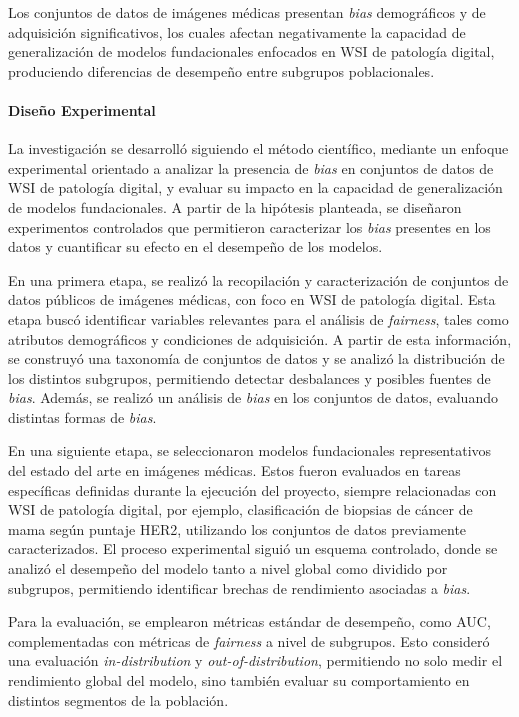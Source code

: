 Los conjuntos de datos de imágenes médicas presentan \textit{bias} demográficos y de adquisición significativos, los cuales afectan negativamente la capacidad de generalización de modelos fundacionales enfocados en WSI de patología digital, produciendo diferencias de desempeño entre subgrupos poblacionales.

\paragraph{Diseño Experimental}

La investigación se desarrolló siguiendo el método científico, mediante un enfoque experimental orientado a analizar la presencia de \textit{bias} en conjuntos de datos de WSI de patología digital, y evaluar su impacto en la capacidad de generalización de modelos fundacionales. A partir de la hipótesis planteada, se diseñaron experimentos controlados que permitieron caracterizar los \textit{bias} presentes en los datos y cuantificar su efecto en el desempeño de los modelos.

En una primera etapa, se realizó la recopilación y caracterización de conjuntos de datos públicos de imágenes médicas, con foco en WSI de patología digital. Esta etapa buscó identificar variables relevantes para el análisis de \textit{fairness}, tales como atributos demográficos y condiciones de adquisición. A partir de esta información, se construyó una taxonomía de conjuntos de datos y se analizó la distribución de los distintos subgrupos, permitiendo detectar desbalances y posibles fuentes de \textit{bias}. Además, se realizó un análisis de \textit{bias} en los conjuntos de datos, evaluando distintas formas de \textit{bias}.

En una siguiente etapa, se seleccionaron modelos fundacionales representativos del estado del arte en imágenes médicas. Estos fueron evaluados en tareas específicas definidas durante la ejecución del proyecto, siempre relacionadas con WSI de patología digital, por ejemplo, clasificación de biopsias de cáncer de mama según puntaje HER2, utilizando los conjuntos de datos previamente caracterizados. El proceso experimental siguió un esquema controlado, donde se analizó el desempeño del modelo tanto a nivel global como dividido por subgrupos, permitiendo identificar brechas de rendimiento asociadas a \textit{bias}.

Para la evaluación, se emplearon métricas estándar de desempeño, como AUC, complementadas con métricas de \textit{fairness} a nivel de subgrupos. Esto consideró una evaluación \textit{in-distribution} y \textit{out-of-distribution}, permitiendo no solo medir el rendimiento global del modelo, sino también evaluar su comportamiento en distintos segmentos de la población.

